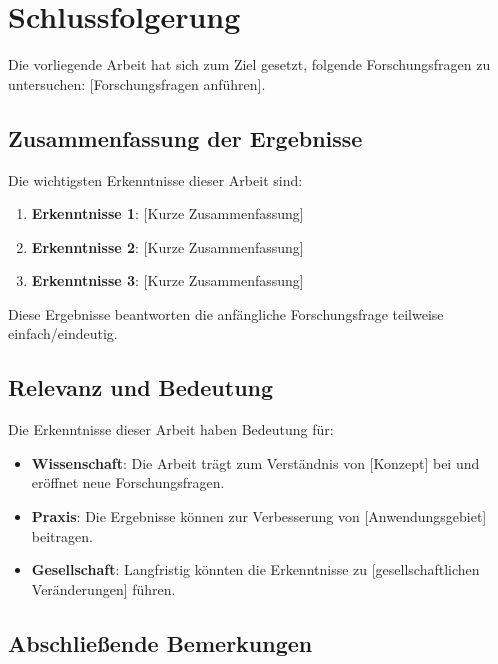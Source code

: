 
\chapter{Schlussfolgerung}
\label{chap:conclusion}

Die vorliegende Arbeit hat sich zum Ziel gesetzt, folgende Forschungsfragen
zu untersuchen: [Forschungsfragen anführen].

\section{Zusammenfassung der Ergebnisse}
\label{sec:conc:summary}

Die wichtigsten Erkenntnisse dieser Arbeit sind:

\begin{enumerate}
    \item \textbf{Erkenntnisse 1}: [Kurze Zusammenfassung]
    \item \textbf{Erkenntnisse 2}: [Kurze Zusammenfassung]
    \item \textbf{Erkenntnisse 3}: [Kurze Zusammenfassung]
\end{enumerate}

Diese Ergebnisse beantworten die anfängliche Forschungsfrage teilweise einfach/eindeutig.

\section{Relevanz und Bedeutung}
\label{sec:conc:relevance}

Die Erkenntnisse dieser Arbeit haben Bedeutung für:

\begin{itemize}
    \item \textbf{Wissenschaft}: Die Arbeit trägt zum Verständnis von [Konzept] bei
          und eröffnet neue Forschungsfragen.
    \item \textbf{Praxis}: Die Ergebnisse können zur Verbesserung von [Anwendungsgebiet]
          beitragen.
    \item \textbf{Gesellschaft}: Langfristig könnten die Erkenntnisse zu
              [gesellschaftlichen Veränderungen] führen.
\end{itemize}

\section{Abschließende Bemerkungen}
\label{sec:conc:remarks}

